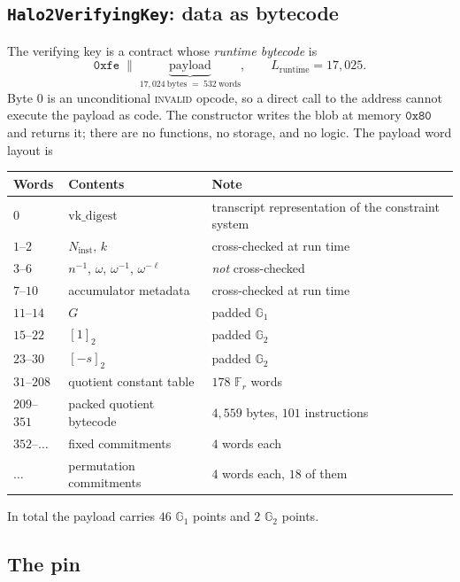 \documentclass[11pt,a4paper]{article}
\newcommand{\Fr}{\ensuremath{\mathbb{F}_{r}}}
\newcommand{\Gone}{\ensuremath{\mathbb{G}_{1}}}
\newcommand{\Gtwo}{\ensuremath{\mathbb{G}_{2}}}
\newcommand{\code}[1]{\texttt{#1}}
\newcommand{\opc}[1]{\textsc{#1}}
\theoremstyle{definition}
\begin{document}
\subsection{\code{Halo2VerifyingKey}: data as bytecode}

The verifying key is a contract whose \emph{runtime bytecode} is
\[
\mathtt{0xfe} \;\|\; \underbrace{\text{payload}}_{17{,}024\ \text{bytes} \;=\; 532\ \text{words}},
\qquad
L_{\mathrm{runtime}} = 17{,}025 .
\]
Byte $0$ is an unconditional \opc{invalid} opcode, so a direct call to the
address cannot execute the payload as code. The constructor writes the blob at
memory $\mathtt{0x80}$ and returns it; there are no functions, no storage, and
no logic. The payload word layout is

\begin{center}
\begin{tabular}{@{}llp{7.2cm}@{}}
\toprule
Words & Contents & Note \\
\midrule
$0$        & $\mathrm{vk\_digest}$   & transcript representation of the constraint system \\
$1$--$2$   & $N_{\mathrm{inst}}$, $k$ & cross-checked at run time \\
$3$--$6$   & $n^{-1}$, $\omega$, $\omega^{-1}$, $\omega^{-\ell}$ & \emph{not} cross-checked \\
$7$--$10$  & accumulator metadata     & cross-checked at run time \\
$11$--$14$ & $G$                      & padded $\Gone$ \\
$15$--$22$ & $[1]_2$                  & padded $\Gtwo$ \\
$23$--$30$ & $[-s]_2$                 & padded $\Gtwo$ \\
$31$--$208$ & quotient constant table & $178$ $\Fr$ words \\
$209$--$351$ & packed quotient bytecode & $4{,}559$ bytes, $101$ instructions \\
$352$--$\ldots$ & fixed commitments    & $4$ words each \\
$\ldots$    & permutation commitments  & $4$ words each, $18$ of them \\
\bottomrule
\end{tabular}
\end{center}

\noindent
In total the payload carries $46$ $\Gone$ points and $2$ $\Gtwo$ points.

\subsection{The pin}
\end{document}
